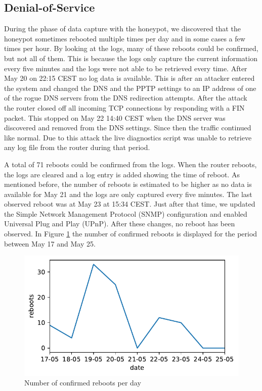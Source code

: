 \subsection{Denial-of-Service}
During the phase of data capture with the honeypot, we discovered that the honeypot sometimes rebooted multiple times per day and in some cases a few times per hour. By looking at the logs, many of these reboots could be confirmed, but not all of them. This is because the logs only capture the current information every five minutes and the logs were not able to be retrieved every time. After May 20 on 22:15 CEST no log data is available. This is after an attacker entered the system and changed the DNS and the PPTP settings to an IP address of one of the rogue DNS servers from the DNS redirection attempts. After the attack the router closed off all incoming TCP connections by responding with a FIN packet. This stopped on May 22 14:40 CEST when the DNS server was discovered and removed from the DNS settings. Since then the traffic continued like normal. Due to this attack the live diagnostics script was unable to retrieve any log file from the router during that period.

A total of 71 reboots could be confirmed from the logs. When the router reboots, the logs are cleared and a log entry is added showing the time of reboot. As mentioned before, the number of reboots is estimated to be higher as no data is available for May 21 and the logs are only captured every five minutes. The last observed reboot was at May 23 at 15:34 CEST. Just after that time, we updated the Simple Network Management Protocol (SNMP) configuration and enabled Universal Plug and Play (UPnP). After these changes, no reboot has been observed. In Figure \ref{fig:observered_reboots} the number of confirmed reboots is displayed for the period between May 17 and May 25.

\begin{figure}[ht]
    \includegraphics[width=\linewidth]{images/reboots_plot.pdf}
    \caption{Number of confirmed reboots per day}
    \label{fig:observered_reboots}
\end{figure}

